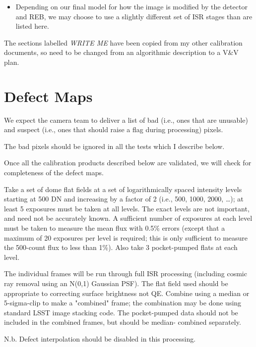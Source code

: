 \documentclass[DM,authoryear,toc,lsstdraft]{lsstdoc}
\begin{document}
\begin{itemize}
\item Depending on our final model for how the image is modified by the detector and REB, we may choose to use a
slightly different set of ISR stages than are listed here.
\end{itemize}

The sections labelled \emph{WRITE ME} have been copied from my other calibration documents, so need to
be changed from an algorithmic description to a V\&V plan.

\section{Defect Maps}

We expect the camera team to deliver a list of bad (i.e., ones that are unusable) and suspect (i.e.,
ones that should raise a flag during processing) pixels.

The bad pixels should be ignored in all the tests which I describe below.

Once all the calibration products described below are validated, we will check for completeness of
the defect maps.

Take a set of dome flat fields at a set of logarithmically spaced intensity
levels starting at 500 DN and increasing by a factor of 2 (i.e., 500, 1000, 2000, \ldots{}); at least 5 exposures
must be taken at all levels.  The exact levels are not important, and need not be accurately known.  A
sufficient number of exposures at each level must be taken to measure the mean flux with 0.5\% errors (except
that a maximum of 20 exposures per level is required; this is only sufficient to measure the 500-count flux to
less than 1\%).  Also take 3 pocket-pumped flats at each level.

The individual frames will be run through full ISR processing (including cosmic ray removal using an N(0,1)
Gaussian PSF).  The flat field used should be appropriate to correcting surface brightness not QE. Combine
using a median or 5-sigma-clip to make a "combined" frame; the combination may be done using standard LSST image
stacking code.  The pocket-pumped data should not be included in the combined frames, but should be median-
combined separately.

N.b. Defect interpolation should be disabled in this processing.
\end{document}
